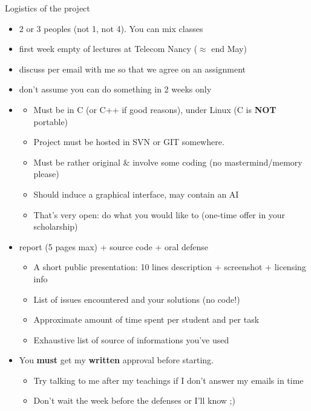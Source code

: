 \begin{frame}{Logistics of the project}
  \begin{itemize}
  \item {} 2 or 3 peoples (not 1, not 4). You can mix classes
  \item {} first week empty of lectures at Telecom Nancy
    ($\approx$ end May)
  \item {} discuss per email with me so that we agree on an assignment
  \item {} don't assume you can do something in 2 weeks only
  \item {}
    \begin{itemize}
    \item Must be in C (or C++ if good reasons), under Linux (C is
      \textbf{NOT} portable)
    \item Project must be hosted in SVN or GIT somewhere.
    \item Must be rather original \& involve some coding %
      {\small(no mastermind/memory please)}
    \item Should induce a graphical interface, may contain an AI
    \item That's very open: do what you would like to (one-time offer in your scholarship)
    \end{itemize}
  \item {} report (5 pages max) + source code + oral defense
    \begin{itemize}
    \item A short public presentation: 10 lines description + screenshot +
      licensing info
    \item List of issues encountered and your solutions (no code!)
    \item Approximate amount of time spent per student and per task
    \item Exhaustive list of source of informations you've used 
    \end{itemize}
  \item   You \textbf{must} get my \textbf{written} approval before starting.
    \begin{itemize}
    \item Try talking to me after my teachings if I don't answer my emails in time
    \item Don't wait the week before the defenses or I'll know ;)
    \end{itemize}
  \end{itemize}
\end{frame}